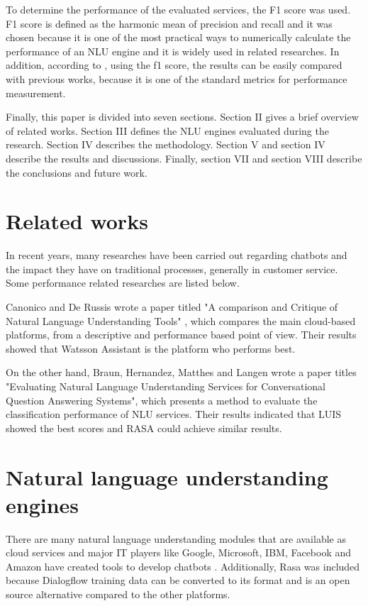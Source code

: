 \documentclass[conference]{IEEEtran}
\begin{document}
To determine the performance of the evaluated services, the F1 score was used. F1 score is defined as the harmonic mean of precision and recall \cite{campesato2020artificial} and it was chosen because it is one of the most practical ways to numerically calculate the performance of an NLU engine and it is widely used in related researches. In addition, according to \cite{arnicans2016databases}, using the f1 score, the results can be easily compared with previous works, because it is one of the standard metrics for performance measurement.

Finally, this paper is divided into seven sections. Section II gives a brief overview of related works. Section III defines the NLU engines evaluated during the research. Section IV describes the methodology. Section V and section IV describe the results and discussions. Finally, section VII and section VIII describe the conclusions and future work.

\section{Related works}
In recent years, many researches have been carried out regarding chatbots and the impact they have on traditional processes, generally in customer service. Some performance related researches are listed below.

Canonico and De Russis wrote a paper titled "A comparison and Critique of Natural Language Understanding Tools" \cite{Canonico2018}, which compares the main cloud-based platforms, from a descriptive and performance based point of view. Their results showed that Watsson Assistant is the platform who performs best.

On the other hand, Braun, Hernandez, Matthes and Langen wrote a paper titles "Evaluating Natural Language Understanding Services for Conversational Question Answering Systems", which presents a method to evaluate the classification performance of NLU services. Their results indicated that LUIS showed the best scores and RASA could achieve similar results.

\section{Natural language understanding engines} \label{sec:nluServices}
There are many natural language understanding modules that are available as cloud services and major IT players like Google, Microsoft, IBM, Facebook and Amazon have created tools to develop chatbots \cite{hall2017hands}. Additionally, Rasa was included because Dialogflow training data can be converted to its format and is an open source alternative compared to the other platforms.
\end{document}
